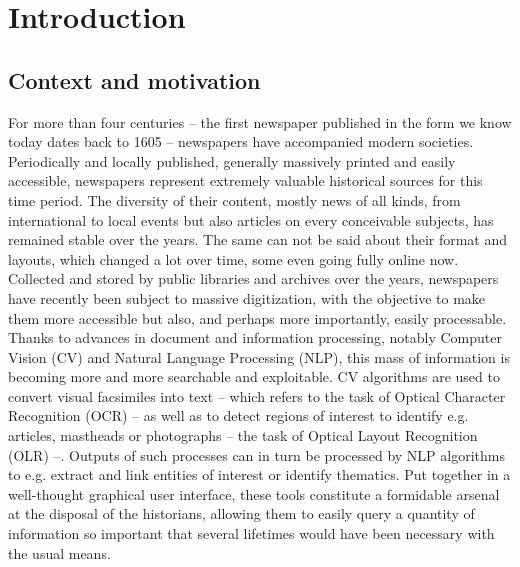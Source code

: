 \chapter{Introduction}
\section{Context and motivation}
For more than four centuries -- the first newspaper published in the form we know today dates back to 1605 \citep{weber_strassburg_2006} -- newspapers have accompanied modern societies. Periodically and locally published, generally massively printed and easily accessible, newspapers represent extremely valuable historical sources for this time period. The diversity of their content, mostly news of all kinds, from international to local events but also articles on every conceivable subjects, has remained stable over the years. The same can not be said about their format and layouts, which changed a lot over time, some even going fully online now. Collected and stored by public libraries and archives over the years, newspapers have recently been subject to massive digitization, with the objective to make them more accessible but also, and perhaps more importantly, easily processable. \\

Thanks to advances in document and information processing, notably Computer Vision (CV) and Natural Language Processing (NLP), this mass of information is becoming more and more searchable and exploitable. CV algorithms are used to convert visual facsimiles into text -- which refers to the task of Optical Character Recognition (OCR) -- as well as to detect regions of interest to identify e.g. articles, mastheads or photographs -- the task of Optical Layout Recognition (OLR) --. Outputs of such processes can in turn be processed by NLP algorithms to e.g. extract and link entities of interest or identify thematics. Put together in a well-thought graphical user interface, these tools constitute a formidable arsenal at the disposal of the historians, allowing them to easily query a quantity of information so important that several lifetimes would have been necessary with the usual means.\\

